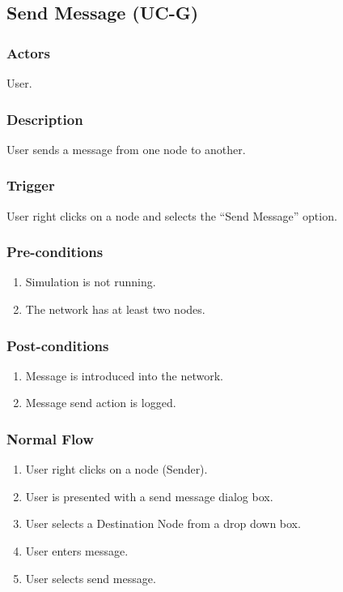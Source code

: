\documentclass[a4paper,11pt,titlepage]{article}
\begin{document}
\subsection{Send Message (UC-G)}
\subsubsection{Actors}
User.

\subsubsection{Description}
User sends a message from one node to another.

\subsubsection{Trigger}
User right clicks on a node and selects the ``Send Message'' option.
\subsubsection{Pre-conditions}

\begin{enumerate}
  \item Simulation is not running.
  \item The network has at least two nodes.
\end{enumerate}

\subsubsection{Post-conditions}

\begin{enumerate}
  \item Message is introduced into the network.
  \item Message send action is logged.
\end{enumerate}

\subsubsection{Normal Flow}
\begin{enumerate}
  \item User right clicks on a node (Sender).
  \item User is presented with a send message dialog box.
  \item User selects a Destination Node from a drop down box.
  \item User enters message.  
  \item User selects send message.
\end{enumerate}
\end{document}
